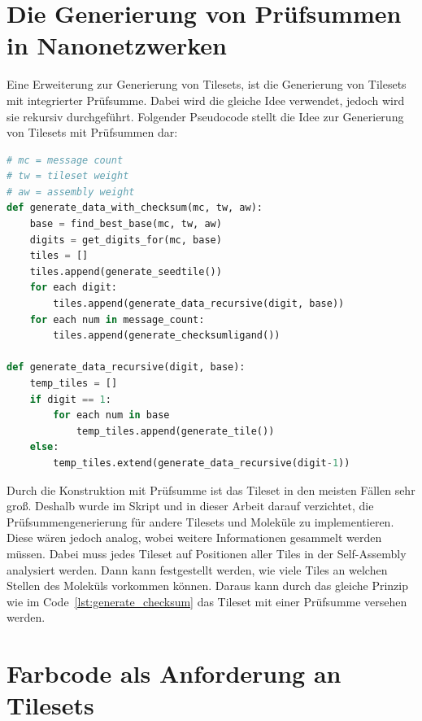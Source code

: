 \section{Die Generierung von Prüfsummen in Nanonetzwerken}

Eine Erweiterung zur Generierung von Tilesets, ist die Generierung von Tilesets mit integrierter Prüfsumme. Dabei wird die gleiche Idee verwendet, jedoch wird sie rekursiv durchgeführt. Folgender Pseudocode stellt die Idee zur Generierung von Tilesets mit Prüfsummen dar:

\begin{lstlisting}[language=python, caption={[Pseudocode für die Generierung eines Tilesets mit Prüfsumme]{Pseudocode für die Generierung eines Tilesets mit Prüfsumme. Die Rekursion wird dabei dazu genutzt, um exponentiell mehr Tiles für jede weitere Ziffernstelle zu erstellen. Auch muss statt einem einzelnen letzten Tile, wie in \texttt{generate\_tile}, für alle codierten Nachrichten ein Prüfsummentile erstellt werden.}}, label=lst:generate_checksum]
# mc = message count  
# tw = tileset weight
# aw = assembly weight
def generate_data_with_checksum(mc, tw, aw):
    base = find_best_base(mc, tw, aw)
    digits = get_digits_for(mc, base)
    tiles = []
    tiles.append(generate_seedtile())
    for each digit:
        tiles.append(generate_data_recursive(digit, base))
    for each num in message_count:
        tiles.append(generate_checksumligand())

def generate_data_recursive(digit, base):
    temp_tiles = []
    if digit == 1:
        for each num in base
            temp_tiles.append(generate_tile())
    else:
        temp_tiles.extend(generate_data_recursive(digit-1))
\end{lstlisting}
Durch die Konstruktion mit Prüfsumme ist das Tileset in den meisten Fällen sehr groß. Deshalb wurde im Skript und in dieser Arbeit darauf verzichtet, die Prüfsummengenerierung für andere Tilesets und Moleküle zu implementieren. Diese wären jedoch analog, wobei weitere Informationen gesammelt werden müssen. Dabei muss jedes Tileset auf Positionen aller Tiles in der Self-Assembly analysiert werden. Dann kann festgestellt werden, wie viele Tiles an welchen Stellen des Moleküls vorkommen können. Daraus kann durch das gleiche Prinzip wie im Code~\ref{lst:generate_checksum} das Tileset mit einer Prüfsumme versehen werden.

\section{Farbcode als Anforderung an Tilesets}

